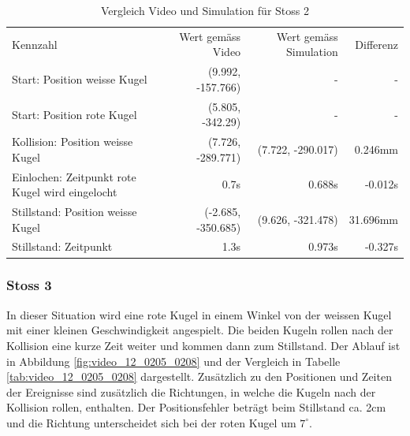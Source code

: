 \begin{table}[ht]
    \begin{tabular}{ lrrr }
        \rowcolor{\seccolor!50}
        Kennzahl & Wert gemäss Video & Wert gemäss Simulation & Differenz \\
        Start: Position weisse Kugel & (9.992, -157.766) & - & -\\
        Start: Position rote Kugel & (5.805, -342.29) & - & -\\
        Kollision: Position weisse Kugel & (7.726, -289.771) & (7.722, -290.017) & 0.246mm\\
        Einlochen: Zeitpunkt rote Kugel wird eingelocht & 0.7s & 0.688s & -0.012s\\
        Stillstand: Position weisse Kugel & (-2.685, -350.685) & (9.626, -321.478) & 31.696mm\\
        Stillstand: Zeitpunkt & 1.3s & 0.973s & -0.327s\\
    \end{tabular}
    \caption{Vergleich Video und Simulation für Stoss 2}
    \label{tab:simulation_vs_reality_1_0028_0032}
\end{table}

\subsubsection{Stoss 3}
In dieser Situation wird eine rote Kugel in einem Winkel von der weissen Kugel mit einer kleinen Geschwindigkeit angespielt.
Die beiden Kugeln rollen nach der Kollision eine kurze Zeit weiter und kommen dann zum Stillstand.
Der Ablauf ist in Abbildung \ref{fig:video_12_0205_0208} und der Vergleich in Tabelle \ref{tab:video_12_0205_0208} dargestellt.
Zusätzlich zu den Positionen und Zeiten der Ereignisse sind zusätzlich die Richtungen, in welche die Kugeln nach der Kollision
rollen, enthalten.
Der Positionsfehler beträgt beim Stillstand ca. 2cm und die Richtung unterscheidet sich bei der roten Kugel um $7^{\circ}$.

